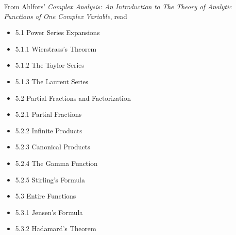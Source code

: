 \documentclass{homework}
\begin{document}
From Ahlfors' \textit{Complex Analysis: An Introduction to The Theory of Analytic Functions of One Complex Variable}, read
\begin{itemize}
\item 5.1 Power Series Expansions
\item 5.1.1 Wierstrass's Theorem
\item 5.1.2 The Taylor Series
\item 5.1.3 The Laurent Series
\item 5.2 Partial Fractions and Factorization
\item 5.2.1 Partial Fractions
\item 5.2.2 Infinite Products
\item 5.2.3 Canonical Products
\item 5.2.4 The Gamma Function
\item 5.2.5 Stirling's Formula
\item 5.3 Entire Functions
\item 5.3.1 Jensen's Formula
\item 5.3.2 Hadamard's Theorem
\end{itemize}
\end{document}
